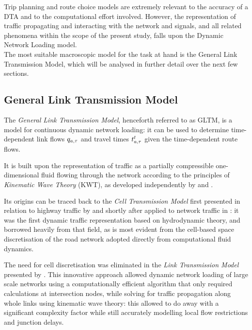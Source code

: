 


Trip planning and route choice models are extremely relevant to the accuracy of a DTA and to the computational effort involved.
However, the representation of traffic propagating and interacting with the network and signals, and all related phenomena within the scope of the present study, falls upon the Dynamic Network Loading model.\\
The most suitable macroscopic model for the task at hand is the General Link Transmission Model, which will be analysed in further detail over the next few sections.

\subsection{General Link Transmission Model}
The \emph{General Link Transmission Model}, henceforth referred to as GLTM, is a model for continuous dynamic network loading: it can be used to determine time-dependent link flows $q_{a,\tau}$ and travel times $t_{a,\tau}^t$ given the time-dependent route flows.

It is built upon the representation of traffic as a partially compressible one-dimensional fluid flowing through the network according to the principles of \emph{Kinematic Wave Theory} (KWT), as developed independently by \cite{lighthill1955kinematic} and \cite{richards1956shock}.

Its origins can be traced back to the \emph{Cell Transmission Model} first presented in relation to highway traffic by \cite{daganzo1994cell} and shortly after applied to network traffic in \citep{daganzo1995cell}: it was the first dynamic traffic representation based on hydrodynamic theory, and borrowed heavily from that field, as is most evident from the cell-based space discretisation of the road network adopted directly from computational fluid dynamics.

The need for cell discretisation was eliminated in the \emph{Link Transmission Model} presented by \cite{yperman2005link}. This innovative approach allowed dynamic network loading of large scale networks using a computationally efficient algorithm that only required calculations at intersection nodes, while solving for traffic propagation along whole links using kinematic wave theory: this allowed to do away with a significant complexity factor while still accurately modelling local flow restrictions and junction delays.

